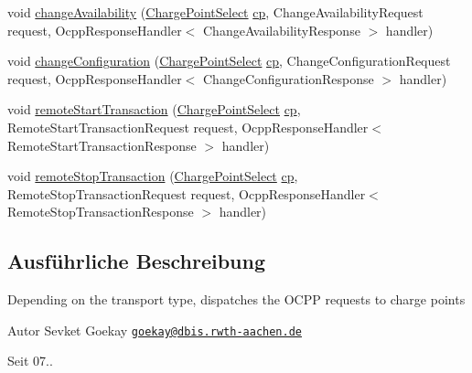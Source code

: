\begin{DoxyCompactItemize}
\item 
void \hyperlink{classde_1_1rwth_1_1idsg_1_1steve_1_1service_1_1_charge_point_service12___dispatcher_a456a1b581ae79d2fe39eb5c8278c1980}{change\-Availability} (\hyperlink{classde_1_1rwth_1_1idsg_1_1steve_1_1repository_1_1dto_1_1_charge_point_select}{Charge\-Point\-Select} \hyperlink{get_transaction_ids_8js_a02fb69feb56940fd46d72ea6a60e511f}{cp}, Change\-Availability\-Request request, Ocpp\-Response\-Handler$<$ Change\-Availability\-Response $>$ handler)
\item 
void \hyperlink{classde_1_1rwth_1_1idsg_1_1steve_1_1service_1_1_charge_point_service12___dispatcher_a3f4f91156db702b0226755045937434b}{change\-Configuration} (\hyperlink{classde_1_1rwth_1_1idsg_1_1steve_1_1repository_1_1dto_1_1_charge_point_select}{Charge\-Point\-Select} \hyperlink{get_transaction_ids_8js_a02fb69feb56940fd46d72ea6a60e511f}{cp}, Change\-Configuration\-Request request, Ocpp\-Response\-Handler$<$ Change\-Configuration\-Response $>$ handler)
\item 
void \hyperlink{classde_1_1rwth_1_1idsg_1_1steve_1_1service_1_1_charge_point_service12___dispatcher_ae54a05abc6053b4a4b996222110dfb74}{remote\-Start\-Transaction} (\hyperlink{classde_1_1rwth_1_1idsg_1_1steve_1_1repository_1_1dto_1_1_charge_point_select}{Charge\-Point\-Select} \hyperlink{get_transaction_ids_8js_a02fb69feb56940fd46d72ea6a60e511f}{cp}, Remote\-Start\-Transaction\-Request request, Ocpp\-Response\-Handler$<$ Remote\-Start\-Transaction\-Response $>$ handler)
\item 
void \hyperlink{classde_1_1rwth_1_1idsg_1_1steve_1_1service_1_1_charge_point_service12___dispatcher_a5f6866aa5df77bdde54f536f006c35be}{remote\-Stop\-Transaction} (\hyperlink{classde_1_1rwth_1_1idsg_1_1steve_1_1repository_1_1dto_1_1_charge_point_select}{Charge\-Point\-Select} \hyperlink{get_transaction_ids_8js_a02fb69feb56940fd46d72ea6a60e511f}{cp}, Remote\-Stop\-Transaction\-Request request, Ocpp\-Response\-Handler$<$ Remote\-Stop\-Transaction\-Response $>$ handler)
\end{DoxyCompactItemize}


\subsection{Ausführliche Beschreibung}
Depending on the transport type, dispatches the O\-C\-P\-P requests to charge points

\begin{DoxyAuthor}{Autor}
Sevket Goekay \href{mailto:goekay@dbis.rwth-aachen.de}{\tt goekay@dbis.\-rwth-\/aachen.\-de} 
\end{DoxyAuthor}
\begin{DoxySince}{Seit}
07.. 
\end{DoxySince}


